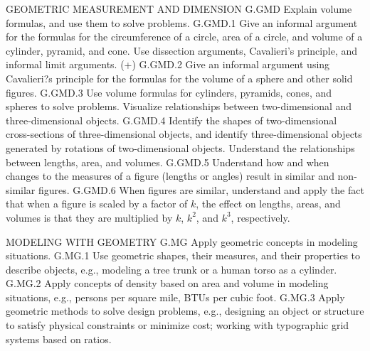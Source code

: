 \begin{teachingnote}
GEOMETRIC MEASUREMENT AND DIMENSION G.GMD
Explain volume formulas, and use them to solve problems.
G.GMD.1 Give an informal argument for the formulas for the
circumference of a circle, area of a circle, and volume of a cylinder,
pyramid, and cone. Use dissection arguments, Cavalieri's principle,
and informal limit arguments.
(+) G.GMD.2 Give an informal argument using Cavalieri?s principle for
the formulas for the volume of a sphere and other solid figures.
G.GMD.3 Use volume formulas for cylinders, pyramids, cones, and
spheres to solve problems.
Visualize relationships between two-dimensional and three-dimensional
objects.
G.GMD.4 Identify the shapes of two-dimensional cross-sections of
three-dimensional objects, and identify three-dimensional objects
generated by rotations of two-dimensional objects.
Understand the relationships between lengths, area,
and volumes.
G.GMD.5 Understand how and when changes to the measures of a
figure (lengths or angles) result in similar and non-similar figures.
G.GMD.6 When figures are similar, understand and apply the fact that
when a figure is scaled by a factor of $k$, the effect on lengths, areas,
and volumes is that they are multiplied by $k$, $k^2$, and $k^3$, respectively.

MODELING WITH GEOMETRY G.MG
Apply geometric concepts in modeling situations.
G.MG.1 Use geometric shapes, their measures, and their properties
to describe objects, e.g., modeling a tree trunk or a human torso as
a cylinder.
G.MG.2 Apply concepts of density based on area and volume in
modeling situations, e.g., persons per square mile, BTUs per
cubic foot.
G.MG.3 Apply geometric methods to solve design problems, e.g.,
designing an object or structure to satisfy physical constraints or
minimize cost; working with typographic grid systems based
on ratios.

\end{teachingnote}


